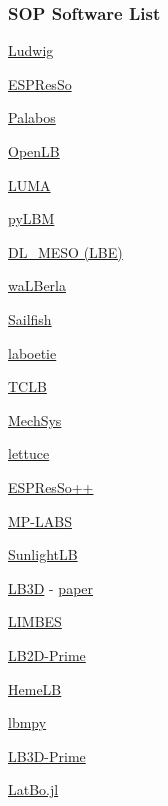 \documentclass[t,12pt,numbers,fleqn]{beamer}
\begin{document}
\begin{frame}
\frametitle{SOP Software List}

\begin{multicols}{2}	
	\bi
			\item \href{https://ludwig.epcc.ed.ac.uk/}{Ludwig}
			\item \href{http://espressomd.org/wordpress/}{ESPResSo}
			\item \href{https://palabos.unige.ch/}{Palabos}
			\item \href{https://www.openlb.net/}{OpenLB}
			\item \href{https://github.com/aharwood2/LUMA/}{LUMA}
			\item \href{https://pypi.org/project/pylbm/}{pyLBM}
			\item \href{https://www.scd.stfc.ac.uk/Pages/DL_MESO.aspx}{DL\_MESO (LBE)}
			\item \href{https://www.walberla.net}{waLBerla}
			\item \href{http://sailfish.us.edu.pl/}{Sailfish}
			\item \href{https://github.com/maxlevesque/laboetie}{laboetie}
			\item \href{https://docs.tclb.io/}{TCLB}
			\item \href{http://mechsys.nongnu.org/}{MechSys}
			\item \href{https://github.com/Olllom/lettuce}{lettuce}
			\item \href{https://github.com/espressopp/espressopp}{ESPResSo++} 
			\item \href{https://github.com/carlosrosales/mplabs}{MP-LABS}		
			\item \href{http://sunlightlb.sourceforge.net/}{SunlightLB}
			\item \href{http://ccs.chem.ucl.ac.uk/lb3d}{LB3D} - 			
			\href{https://www.sciencedirect.com/science/article/pii/S0010465517301017}{paper}
			\item \href{https://code.google.com/archive/p/limbes/}{LIMBES}
			\item \href{http://faculty.fiu.edu/~sukopm/LBnD_Prime/LBnD_Prime.html}{LB2D-Prime}	
			\item \href{https://github.com/UCL/hemelb}{HemeLB} 
			\item \href{https://pypi.org/project/lbmpy/}{lbmpy}	
			\item \href{http://faculty.fiu.edu/~sukopm/LBnD_Prime/LBnD_Prime.html}{LB3D-Prime}	
			\item \href{https://github.com/UCL/LatBo.jl}{LatBo.jl}
	\ei
\end{multicols}

\end{frame}
\end{document}
